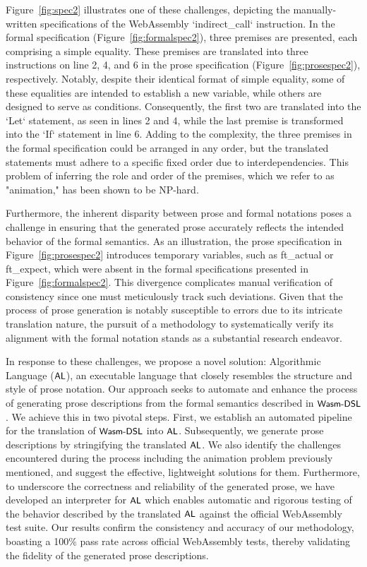 Figure~\ref{fig:spec2} illustrates one of these challenges, depicting the
manually-written specifications of the WebAssembly `indirect\_call` instruction. In
the formal specification (Figure~\ref{fig:formalspec2}), three premises are
presented, each comprising a simple equality. These premises are translated
into three instructions on line 2, 4, and 6 in the prose specification
(Figure~\ref{fig:prosespec2}), respectively. Notably, despite their identical
format of simple equality, some of these equalities are intended to establish a
new variable, while others are designed to serve as conditions. Consequently,
the first two are translated into the `Let` statement, as seen in lines 2 and 4,
while the last premise is transformed into the `If` statement in line 6. Adding
to the complexity, the three premises in the formal specification could be
arranged in any order, but the translated statements must adhere to a specific
fixed order due to interdependencies. This problem of inferring the role and
order of the premises, which we refer to as "animation," has been shown to be
NP-hard.

Furthermore, the inherent disparity between prose and formal notations poses a
challenge in ensuring that the generated prose accurately reflects the intended
behavior of the formal semantics. As an illustration, the prose specification
in Figure~\ref{fig:prosespec2} introduces temporary variables, such as
ft\_actual or ft\_expect, which were absent in the formal specifications
presented in Figure~\ref{fig:formalspec2}. This divergence complicates manual
verification of consistency since one must meticulously track such deviations.
Given that the process of prose generation is notably susceptible to errors due
to its intricate translation nature, the pursuit of a methodology to
systematically verify its alignment with the formal notation stands as a
substantial research endeavor.

In response to these challenges, we propose a novel solution: Algorithmic
Language ($\textsf{\small AL}$), an executable language that closely resembles the structure
and style of prose notation. Our approach seeks to automate and enhance the
process of generating prose descriptions from the formal semantics described in
$\textsf{\small Wasm-DSL}$. We achieve this in two pivotal steps. First, we establish an automated
pipeline for the translation of $\textsf{\small Wasm-DSL}$ into $\textsf{\small AL}$. Subsequently, we generate
prose descriptions by stringifying the translated $\textsf{\small AL}$. We also identify the
challenges encountered during the process including the animation problem
previously mentioned, and suggest the effective, lightweight solutions for
them. Furthermore, to underscore the correctness and reliability of the
generated prose, we have developed an interpreter for $\textsf{\small AL}$ which enables
automatic and rigorous testing of the behavior described by the translated
$\textsf{\small AL}$ against the official WebAssembly test suite. Our results confirm the
consistency and accuracy of our methodology, boasting a 100\% pass rate across
official WebAssembly tests, thereby validating the fidelity of the generated
prose descriptions.

